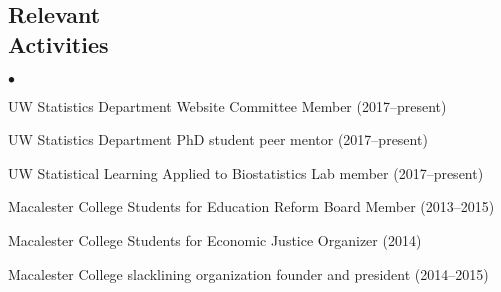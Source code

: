 \documentclass[margin,centered]{res}
\newenvironment{list1}{
  \begin{list}{\ding{113}}{%
      \setlength{\itemsep}{0in}
      \setlength{\parsep}{0in} \setlength{\parskip}{0in}
      \setlength{\topsep}{0in} \setlength{\partopsep}{0in}
      \setlength{\leftmargin}{0.17in}}}{\end{list}}
\newenvironment{list2}{
  \begin{list}{$\bullet$}{%
      \setlength{\itemsep}{0in}
      \setlength{\parsep}{0in} \setlength{\parskip}{0in}
      \setlength{\topsep}{0in} \setlength{\partopsep}{0in}
      \setlength{\leftmargin}{0.2in}}}{\end{list}}
\begin{document}
\begin{resume}
\section{\sc Relevant \\ Activities}


\begin{list1}
\item[]
\begin{list2}
\vspace*{.05in}
\item UW Statistics Department Website Committee Member (2017--present)
\item UW Statistics Department PhD student peer mentor (2017--present)
\item UW Statistical Learning Applied to Biostatistics Lab member (2017--present)
\item Macalester College Students for Education Reform Board Member (2013--2015)
\item Macalester College Students for Economic Justice Organizer (2014)
\item Macalester College slacklining organization founder and president (2014--2015)
\end{list2}
\end{list1}




\begin{comment}
\section{\sc Extra-- \\ Cirriculars} 






{\bf Macalester College}, St. Paul, Minnesota
\begin{list1}
\item[]
\begin{list2}
\vspace*{.05in}
\item Board member of Macalester College Students for Education Reform
\item Organizer of Students for Economic Justice
\item Founder and president of Macalester College student slacklining organization
\end{list2}
\end{list1}
\end{comment}


\end{resume}
\end{document}
